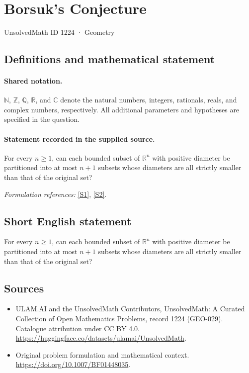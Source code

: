 \documentclass[11pt]{article}
\newcommand{\sref}[2]{\hyperlink{source:#1:#2}{[S#2]}}
\begin{document}
\setcounter{section}{1223}
\section{Borsuk's Conjecture}\label{1224}
{\small UnsolvedMath ID 1224 · Geometry}
\subsection{Definitions and mathematical statement}

\paragraph{Shared notation.}$\mathbb N$, $\mathbb Z$, $\mathbb Q$, $\mathbb R$, and $\mathbb C$ denote the natural numbers, integers, rationals, reals, and complex numbers, respectively. All additional parameters and hypotheses are specified in the question.


\paragraph{Statement recorded in the supplied source.}
For every $n\geq1$, can each bounded subset of $\mathbb R^n$ with positive diameter be partitioned into at most $n+1$ subsets whose diameters are all strictly smaller than that of the original set?
\par\smallskip\textit{Formulation references:} \sref{1224}{1}, \sref{1224}{2}.
\subsection{Short English statement}
For every $n\geq1$, can each bounded subset of $\mathbb R^n$ with positive diameter be partitioned into at most $n+1$ subsets whose diameters are all strictly smaller than that of the original set?
\subsection{Sources}
\begin{itemize}
\item[\hypertarget{source:1224:1}{S1}] ULAM.AI and the UnsolvedMath Contributors, UnsolvedMath: A Curated Collection of Open Mathematics Problems, record 1224 (GEO-029). Catalogue attribution under CC BY 4.0.
\url{https://huggingface.co/datasets/ulamai/UnsolvedMath}.
\item[\hypertarget{source:1224:2}{S2}] Original problem formulation and mathematical context.
\url{https://doi.org/10.1007/BF01448035}.
\end{itemize}
\label{end:1224}
\end{document}
